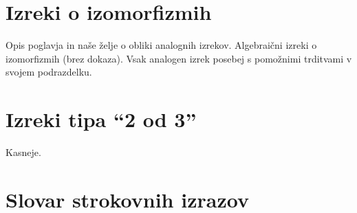 \documentclass[mat1]{fmfdelo}
\begin{document}
\section{Izreki o izomorfizmih}
Opis poglavja in naše želje o obliki analognih izrekov.
Algebraični izreki o izomorfizmih (brez dokaza).
Vsak analogen izrek posebej s pomožnimi trditvami v svojem podrazdelku.

\section{Izreki tipa ``2 od 3''}
Kasneje.



\section*{Slovar strokovnih izrazov}

\geslo{}{}
\geslo{}{}

\begin{thebibliography}{99}


\end{thebibliography}
\end{document}
